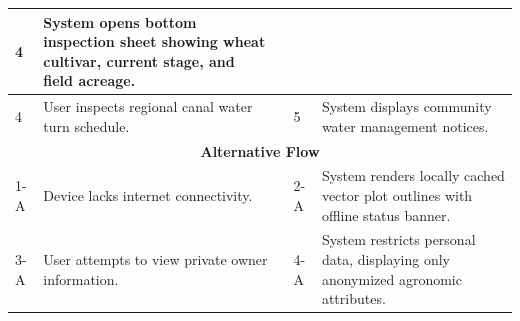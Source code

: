 \documentclass{FastFyp}
\begin{document}
\begin{table}[!ht]
\begin{tabular}{|lllll|}
  \multicolumn{1}{p{0.8cm}|}{4} &
  \multicolumn{1}{p{5.6cm}|}{System opens bottom inspection sheet showing wheat cultivar, current stage, and field acreage.} \\ \hline
\multicolumn{1}{|p{0.8cm}|}{4} &
  \multicolumn{2}{p{6.0cm}|}{User inspects regional canal water turn schedule.} &
  \multicolumn{1}{p{0.8cm}|}{5} &
  \multicolumn{1}{p{5.6cm}|}{System displays community water management notices.} \\ \hline
\multicolumn{5}{|c|}{\textbf{Alternative Flow}} \\ \hline
\multicolumn{1}{|p{0.8cm}|}{1-A} &
  \multicolumn{2}{p{6.0cm}|}{Device lacks internet connectivity.} &
  \multicolumn{1}{p{0.8cm}|}{2-A} &
  \multicolumn{1}{p{5.6cm}|}{System renders locally cached vector plot outlines with offline status banner.} \\ \hline
\multicolumn{1}{|p{0.8cm}|}{3-A} &
  \multicolumn{2}{p{6.0cm}|}{User attempts to view private owner information.} &
  \multicolumn{1}{p{0.8cm}|}{4-A} &
  \multicolumn{1}{p{5.6cm}|}{System restricts personal data, displaying only anonymized agronomic attributes.} \\ \hline
\end{tabular}
\end{table}
\end{document}
